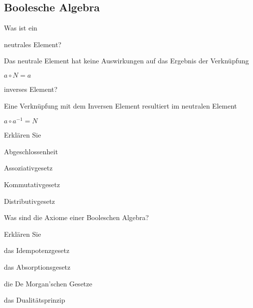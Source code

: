 \documentclass
[
  draft    = true,
  fontsize = 11pt,
  parskip  = half-,
  BCOR     = 0pt,
  DIV      = 11,
  ngerman,
  dvipsnames
]
{scrartcl}
\begin{document}
\subsection*{Boolesche Algebra}
\begin{mytemize}
  \item Was ist ein
        \begin{mytemize}
          \item neutrales Element?
	          \begin{mytemize}
	          	\begin{karsten}
	          		\item Das neutrale Element hat keine Auswirkungen auf das Ergebnis der Verknüpfung
	          		\item $a \circ N = a$
	          	\end{karsten}
        \end{mytemize}
          \item inverses Element?
	          \begin{mytemize}
		          \begin{karsten}
		          	\item Eine Verknüpfung mit dem Inversen Element resultiert im neutralen Element
		          	\item $a \circ a^{-1} = N$
		          \end{karsten}
	          \end{mytemize}
        \end{mytemize}
  \item Erklären Sie
        \begin{mytemize}
          \item Abgeschlossenheit
          \item Assoziativgesetz
          \item Kommutativgesetz
          \item Distributivgesetz
        \end{mytemize}
  \item Was sind die Axiome einer Booleschen Algebra?
  \item Erklären Sie
        \begin{mytemize}
          \item das Idempotenzgesetz
          \item das Absorptionsgesetz
          \item die De Morgan'schen Gesetze
          \item das Dualitätsprinzip
        \end{mytemize}

\end{mytemize}
\end{document}
